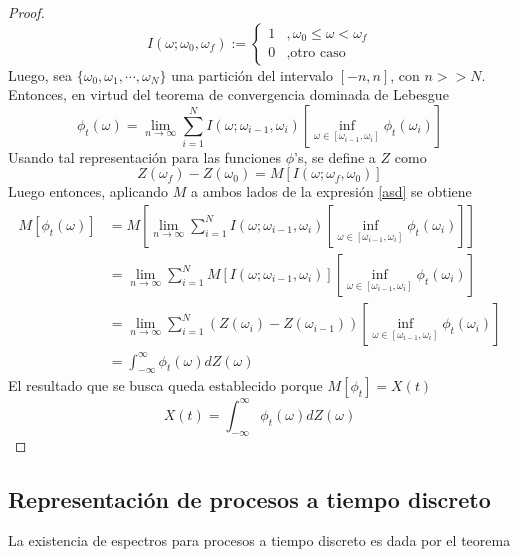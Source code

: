 \documentclass[12pt,letterpaper,draft]{book}
\newcommand{\intR}{\int_{-\infty}^{\infty}}
\begin{document}
\begin{proof}
\begin{equation}
I(\omega; \omega_0, \omega_f) := \begin{cases}
1 &, \omega_0 \leq \omega < \omega_f \\
0 &, \text{otro caso}
\end{cases}
\end{equation}
Luego, sea $\{\omega_0, \omega_1, \cdots, \omega_N\}$ una partición del intervalo $[-n,n]$, con $n>>N$. Entonces, en virtud del teorema de convergencia dominada de Lebesgue
\begin{equation}
\phi_t(\omega) = \lim_{n\rightarrow\infty} \sum_{i=1}^{N} I(\omega; \omega_{i-1}, \omega_i) \left[  \inf_{\omega \in [\omega_{i-1},\omega_i]} \phi_t(\omega_{i})\right]
\label{asd}
\end{equation}
Usando tal representación para las funciones $\phi$'s, se define a $Z$ como
\begin{equation}
Z(\omega_f) - Z(\omega_0) = M\left[ I(\omega; \omega_f, \omega_0) \right]
\end{equation}
Luego entonces, aplicando $M$ a ambos lados de la expresión \ref{asd} se obtiene
\begin{align*}
M\left[ \phi_t(\omega) \right] &= M\left[ \lim_{n\rightarrow\infty} \sum_{i=1}^{N} I(\omega; \omega_{i-1}, \omega_i) \left[  \inf_{\omega \in [\omega_{i-1},\omega_i]} \phi_t(\omega_{i})\right] \right] \\
&= \lim_{n\rightarrow\infty} \sum_{i=1}^{N} M\left[I(\omega; \omega_{i-1}, \omega_i) \right] \left[  \inf_{\omega \in [\omega_{i-1},\omega_i]} \phi_t(\omega_{i})\right] \\
&= \lim_{n\rightarrow\infty} \sum_{i=1}^{N} \left( Z(\omega_i) - Z(\omega_{i-1})\right) \left[  \inf_{\omega \in [\omega_{i-1},\omega_i]} \phi_t(\omega_{i})\right] \\
&= \intR \phi_t(\omega) dZ(\omega)
\end{align*}
El resultado que se busca queda establecido porque $M[\phi_t] = X(t)$
\begin{equation}
X(t) = \intR \phi_t(\omega) dZ(\omega)
\end{equation}
\end{proof}

\subsection{Representación de procesos a tiempo discreto}

La existencia de espectros para procesos a tiempo discreto es dada por el teorema
\end{document}
